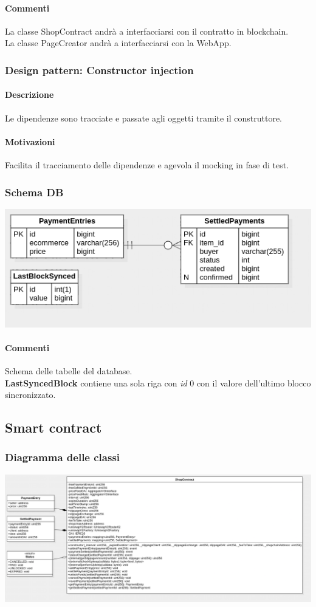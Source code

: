 \documentclass[a4paper, 12pt]{article}
\begin{document}
\paragraph{Commenti}
La classe ShopContract andrà a interfacciarsi con il contratto in blockchain.\\
La classe PageCreator andrà a interfacciarsi con la WebApp.
\subsubsection{Design pattern: Constructor injection}
\paragraph{Descrizione}
Le dipendenze sono tracciate e passate agli oggetti tramite il construttore.
\paragraph{Motivazioni}
Facilita il tracciamento delle dipendenze e agevola il mocking in fase di test.
\subsubsection{Schema DB}
\includegraphics[width=1.0\textwidth]{db}
\paragraph{Commenti}
Schema delle tabelle del database.\\
\textbf{LastSyncedBlock} contiene una sola riga con \textit{id} 0 con il valore dell'ultimo blocco sincronizzato.

\subsection{Smart contract}
\subsubsection{Diagramma delle classi}
\includegraphics[width=1.0\textwidth]{contract}
\end{document}
